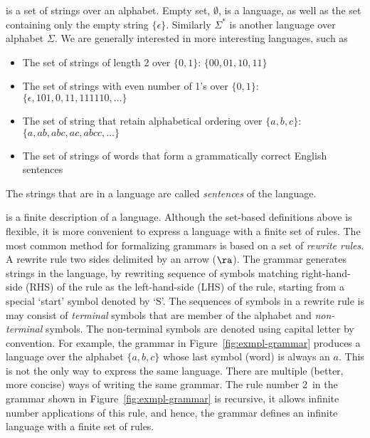  is a set of strings over an alphabet.
Empty set, $\emptyset$, is a language,
as well as the set containing only the empty string $\{\epsilon\}$.
Similarly $\Sigma^{*}$ is another language over alphabet $\Sigma$.
We are generally interested in more interesting languages,
such as%
\begin{itemize}
  \item The set of strings of length \num{2}
    over $\{0, 1\}$: $\{00, 01, 10, 11\}$
  \item The set of strings with even number of \num{1}'s over $\{0, 1\}$:
      $\{\epsilon, 101, 0, 11, 111110, \ldots\}$
  \item The set of string that retain alphabetical ordering
    over $\{a, b, c\}$: $\{a, ab, abc, ac, abcc, \ldots\}$
  \item The set of strings of words
    that form a grammatically correct English sentences
\end{itemize}
The strings that are in a language are called \emph{sentences} of the language.

 is a finite description of a language.
Although the set-based definitions above is flexible,
it is more convenient to express a language with a finite set of rules.
The most common method for formalizing grammars is based on
a set of \emph{rewrite rules}.
A rewrite rule two sides delimited by an arrow ($\ra$).
The grammar generates strings in the language,
by rewriting sequence of symbols matching right-hand-side (RHS) of the rule 
as the left-hand-side (LHS) of the rule,
starting from a special `start' symbol denoted by `S'.
The sequences of symbols in a rewrite rule is may consist of
\emph{terminal} symbols that are member of the alphabet
and \emph{non-terminal} symbols.
The non-terminal symbols are denoted using capital letter by convention.
For example, the grammar in Figure~\ref{fig:exmpl-grammar}
produces a language over the alphabet $\{a, b, c\}$
whose last symbol (word) is always an $a$.
This is not the only way to express the same language.
There are multiple (better, more concise) ways of writing
the same grammar.
The rule number 2\ in the grammar shown in Figure~\ref{fig:exmpl-grammar}
is recursive, it allows infinite number applications of this rule,
and hence, the grammar defines an infinite language with a finite set of rules.

